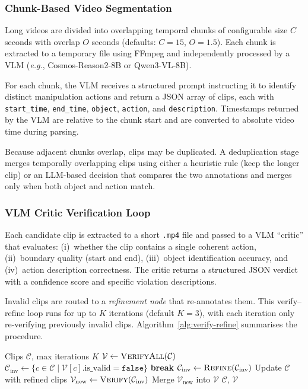 \documentclass[10pt,twocolumn]{article}
\newcommand{\eg}{\textit{e.g.}}
\begin{document}
\subsubsection{Chunk-Based Video Segmentation}

Long videos are divided into overlapping temporal chunks of
configurable size $C$ seconds with overlap $O$ seconds
(defaults: $C{=}15$, $O{=}1.5$).
Each chunk is extracted to a temporary file using FFmpeg and
independently processed by a VLM (\eg, Cosmos-Reason2-8B or
Qwen3-VL-8B).

For each chunk, the VLM receives a structured prompt instructing it
to identify distinct manipulation actions and return a JSON array of
clips, each with \texttt{start\_time}, \texttt{end\_time},
\texttt{object}, \texttt{action}, and \texttt{description}.
Timestamps returned by the VLM are relative to the chunk start and
are converted to absolute video time during parsing.

Because adjacent chunks overlap, clips may be duplicated.
A deduplication stage merges temporally overlapping clips using
either a heuristic rule (keep the longer clip) or an LLM-based
decision that compares the two annotations and merges only when
both object and action match.

\subsubsection{VLM Critic Verification Loop}

Each candidate clip is extracted to a short \texttt{.mp4} file and
passed to a VLM ``critic'' that evaluates:
(i)~whether the clip contains a single coherent action,
(ii)~boundary quality (start and end),
(iii)~object identification accuracy, and
(iv)~action description correctness.
The critic returns a structured JSON verdict with a confidence
score and specific violation descriptions.

Invalid clips are routed to a \emph{refinement node} that
re-annotates them.  This verify--refine loop runs for up to
$K$ iterations (default $K{=}3$), with each iteration only
re-verifying previously invalid clips.
Algorithm~\ref{alg:verify-refine} summarises the procedure.

\begin{algorithm}[t]
\caption{Verify--Refine Loop}\label{alg:verify-refine}
\begin{algorithmic}[1]
\Require Clips $\mathcal{C}$, max iterations $K$
\State $\mathcal{V} \gets \textsc{VerifyAll}(\mathcal{C})$
  \State $\mathcal{C}_{\text{inv}} \gets \{c \in \mathcal{C} \mid \mathcal{V}[c].\text{is\_valid} = \texttt{false}\}$
    \State \textbf{break}
  \EndIf
  \State $\mathcal{C}_{\text{inv}} \gets \textsc{Refine}(\mathcal{C}_{\text{inv}})$
  \State Update $\mathcal{C}$ with refined clips
  \State $\mathcal{V}_{\text{new}} \gets \textsc{Verify}(\mathcal{C}_{\text{inv}})$
  \State Merge $\mathcal{V}_{\text{new}}$ into $\mathcal{V}$
\EndFor
\State \Return $\mathcal{C}$, $\mathcal{V}$
\end{algorithmic}
\end{algorithm}
\end{document}
